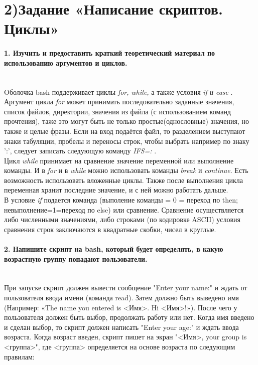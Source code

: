 \newpage
	\section*{2)Задание  «Написание скриптов. Циклы»}
	\paragraph*{ 1. Изучить и предоставить краткий теоретический материал по 				использованию аргументов и циклов. \\ \\}

Oболочка bash поддерживает циклы \textit{for, while,}  а также условия \textit{if и case} .\\ 
	
Аргумент цикла \textit{for} может принимать последовательно заданные значения, список файлов, директории, значения из файла (с использованием команд прочтения), таже это могут быть не только простые(однословные) значения, но также и целые фразы. Если на вход подаётся файл, то разделением выступают знаки табуляции, пробелы и переносы строк, чтобы выбрать например по знаку ':', следует записать следующую команду \textit{IFS=:} .\\

Цикл \textit{while} принимает на сравнение значение переменной или выполнение команды. И в \textit{for} и в \textit{while} можно использовать команды \textit{break} и \textit{continue}. Есть возможность использовать вложенные циклы. Также после выполнения цикла переменная хранит последние значение, и с ней можно работать дальше.  \\

В условие \textit{if} подается команда (выполение команды = 0 = переход по then; невыполнение=1=переход по else) или сравнение. Сравнение осуществляется либо численными значениями, либо строками (по кодировке ASCII) условия сравнения строк заключаются в квадратные скобки, чисел в круглые. \\

	\paragraph*{2. Напишите скрипт на bash, который будет определять, в какую возрастную группу попадают пользователи. \\ \\}
	
При запуске скрипт должен вывести сообщение "Enter your name:" и ждать от пользователя ввода имени (команда read). Затем должно быть выведено имя (Например: «The name you entered is <Имя>. Hi <Имя>!»). После чего у пользователя должен быть выбор, продолжать работу или нет. Когда имя введено и сделан выбор, то скрипт должен написать "Enter your age:" и ждать ввода возраста. Когда возраст введен, скрипт пишет на экран "<Имя>, your group is <группа>", где <группа> определяется на основе возраста по следующим правилам: \\

